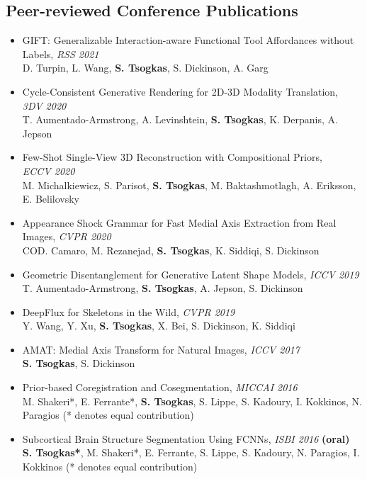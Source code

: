 \documentclass[margin]{res}
\begin{document}
\begin{resume}
\section{Peer-reviewed Conference Publications} 
	\begin{itemize}
		\item GIFT: Generalizable Interaction-aware Functional Tool Affordances without Labels, \emph{RSS 2021} \\
			D. Turpin, L. Wang, \textbf{S. Tsogkas}, S. Dickinson, A. Garg		
		\item Cycle-Consistent Generative Rendering for 2D-3D Modality Translation, \\ \emph{3DV 2020} \\
			T. Aumentado-Armstrong, A. Levinshtein, \textbf{S. Tsogkas}, K. Derpanis, A. Jepson
		\item Few-Shot Single-View 3D Reconstruction with Compositional Priors, 
			\\ \emph{ECCV 2020}\\
			M. Michalkiewicz, S. Parisot, \textbf{S. Tsogkas}, M. Baktashmotlagh, A. Eriksson, E. Belilovsky 
		\item Appearance Shock Grammar for Fast Medial Axis Extraction from Real Images, \emph{CVPR 2020}\\
			COD. Camaro, M. Rezanejad, \textbf{S. Tsogkas}, K. Siddiqi, S. Dickinson 
		\item Geometric Disentanglement for Generative Latent Shape Models, \emph{ICCV 2019}\\
			T. Aumentado-Armstrong, \textbf{S. Tsogkas}, A. Jepson, S. Dickinson 
		\item DeepFlux for Skeletons in the Wild, \emph{CVPR 2019}\\
			Y. Wang, Y. Xu, \textbf{S. Tsogkas}, X. Bei, S. Dickinson, K. Siddiqi 
		\item AMAT: Medial Axis Transform for Natural Images, \emph{ICCV 2017}\\
			\textbf{S. Tsogkas}, S. Dickinson 
		\item  Prior-based Coregistration and Cosegmentation, \emph{MICCAI 2016}\\
			M. Shakeri*, E. Ferrante*, \textbf{S. Tsogkas}, S. Lippe, S. Kadoury, I. Kokkinos,  N. Paragios (* denotes equal contribution)   
		\item  Subcortical Brain Structure Segmentation Using FCNNs, \emph{ISBI 2016} \textbf{(oral)}\\
			\textbf{S. Tsogkas*}, M. Shakeri*, E. Ferrante, S. Lippe, S. Kadoury, N. Paragios, I. Kokkinos (* denotes equal contribution)   

\end{itemize}
\end{resume}
\end{document}
